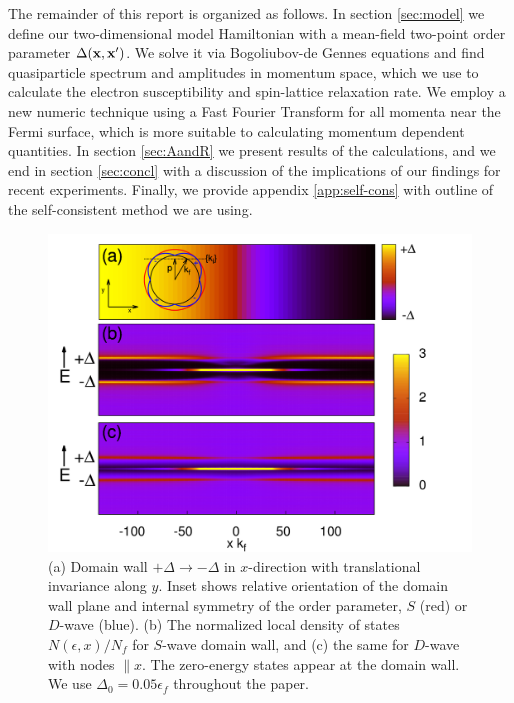 \documentclass[prb,aps,showpacs,amsmath,twocolumn,10pt]{revtex4-1}
\begin{document}
The remainder of this report is organized as follows. In section
\ref{sec:model} we define our two-dimensional model Hamiltonian 
with a mean-field two-point order parameter $\Delta({\bf x},{\bf x}')$. 
We solve it via Bogoliubov-de Gennes equations and find quasiparticle spectrum and
amplitudes in momentum space, which we use to calculate the electron susceptibility 
and spin-lattice relaxation rate. We employ a new numeric
technique using a Fast Fourier Transform for all momenta near the Fermi surface, which is more suitable to calculating
momentum dependent quantities. 
In section \ref{sec:AandR} we present results of the calculations, and we end
in section \ref{sec:concl} with a discussion of the implications of our findings for recent experiments. 
Finally, we provide appendix \ref{app:self-cons} with outline of the self-consistent 
method we are using.

\begin{figure}
\includegraphics[scale=0.21]{./Fig1}
\caption{\label{fig:1}
(a) Domain wall $+\Delta \to -\Delta$ in $x$-direction with translational
invariance along $y$. Inset shows relative orientation of the domain wall plane 
and internal symmetry of the order parameter, $S$ (red) or $D$-wave (blue). 
(b) The normalized local density of states $N(\epsilon,x)/N_f$ for $S$-wave domain wall, and  
(c) the same for $D$-wave with nodes $\parallel x$. The zero-energy states appear at the domain wall. 
We use $\Delta_0=0.05\epsilon_f$ throughout the paper.  
} 
\end{figure}
\end{document}
